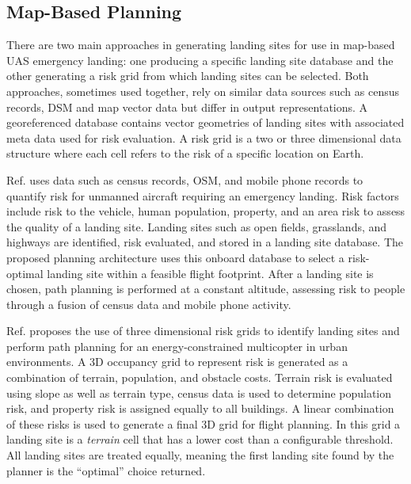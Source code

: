 
\subsection{Map-Based Planning}\label{sec:ch5_map_based_planning}

There are two main approaches in generating landing sites for use in map-based \ac{UAS} emergency landing: one producing a specific landing site database and the other generating a risk grid from which landing sites can be selected. Both approaches, sometimes used together, rely on similar data sources such as census records, \ac{DSM} and map vector data but differ in output representations. A georeferenced database contains vector geometries of landing sites with associated meta data used for risk evaluation. A risk grid is a two or three dimensional data structure where each cell refers to the risk of a specific location on Earth.

Ref. \cite{di_donato_evaluating_2017} uses data such as census records, \ac{OSM}, and mobile phone records to quantify risk for unmanned aircraft requiring an emergency landing. Risk factors include risk to the vehicle, human population, property, and an area risk to assess the quality of a landing site. Landing sites such as open fields, grasslands, and highways are identified, risk evaluated, and stored in a landing site database. The proposed planning architecture uses this onboard database to select a risk-optimal landing site within a feasible flight footprint. After a landing site is chosen, path planning is performed at a constant altitude, assessing risk to people through a fusion of census data and mobile phone activity.

Ref. \cite{ten_harmsel_emergency_2017} proposes the use of three dimensional risk grids to identify landing sites and perform path planning for an energy-constrained multicopter in urban environments. A 3D occupancy grid to represent risk is generated as a combination of terrain, population, and obstacle costs.  Terrain risk is evaluated using slope as well as terrain type, census data is used to determine population risk, and property risk is assigned equally to all buildings. A linear combination of these risks is used to generate a final 3D grid for flight planning. In this grid a landing site is a \emph{terrain} cell that has a lower cost than a configurable threshold. All landing sites are treated equally, meaning the first landing site found by the planner is the ``optimal'' choice returned.

